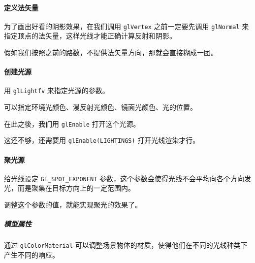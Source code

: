 \documentclass[
]{article}
\begin{document}
\hypertarget{header-n59}{%
\paragraph{定义法矢量}\label{header-n59}}

为了画出好看的阴影效果，在我们调用 \texttt{glVertex} 之前一定要先调用
\texttt{glNormal} 来指定顶点的法矢量，这样光线才能正确计算反射和阴影。

假如我们按照之前的路数，不提供法矢量方向，那就会直接糊成一团。

\hypertarget{header-n62}{%
\paragraph{创建光源}\label{header-n62}}

用 \texttt{glLightfv} 来指定光源的参数。

可以指定环境光颜色、漫反射光颜色、镜面光颜色、光的位置。

在此之後，我们用 \texttt{glEnable} 打开这个光源。

这还不够，还需要用 \texttt{glEnable(LIGHTINGS)} 打开光线渲染才行。

\hypertarget{header-n67}{%
\paragraph{聚光源}\label{header-n67}}

给光线设定 \texttt{GL\_SPOT\_EXPONENT}
参数，这个参数会使得光线不会平均向各个方向发光，而是聚集在目标方向上的一定范围内。

调整这个参数的值，就能实现聚光的效果了。

\hypertarget{header-n70}{%
\subparagraph{模型属性}\label{header-n70}}

通过 \texttt{glColorMaterial}
可以调整场景物体的材质，使得他们在不同的光线种类下产生不同的响应。
\end{document}

